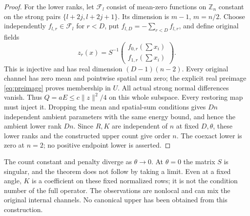 \documentclass[11pt,a4paper]{article}
\newcommand{\Z}{\mathbb Z}
\newcommand{\norm}[1]{\lVert#1\rVert}
\begin{document}
\begin{proof}
For the lower ranks, let $\mathcal F_l$ consist of mean-zero functions on
$\Z_n$ constant on the strong pairs $\{l+2j,l+2j+1\}$.
Its dimension is $m-1$, $m=n/2$. Choose independently
$f_{l,r}\in\mathcal F_l$ for $r<D$, put
$f_{l,D}=-\sum_{r<D}f_{l,r}$, and define original fields
\[
 z_r(x)=S^{-1}\begin{pmatrix}f_{0,r}(\sum x_i)\\ f_{1,r}(\sum x_i)\end{pmatrix}.
\]
This is injective and has real dimension $(D-1)(n-2)$. Every original channel
has zero mean and pointwise spatial sum zero; the explicit real preimage
\eqref{eq:preimage} proves membership in $U$. All actual strong normal
differences vanish. Thus $Q=aE\leq c\norm z^2/4$ on this whole subspace.
Every restoring map must inject it. Dropping the mean and spatial-sum
conditions gives $Dn$ independent ambient parameters with the same energy
bound, and hence the ambient lower rank $Dn$.
Since $R,K$ are independent of $n$ at fixed $D,\theta$, these lower ranks and
the constructed upper count give order $n$. The coexact lower is zero at
$n=2$; no positive endpoint lower is asserted.
\end{proof}

The count constant and penalty diverge as $\theta\to0$. At $\theta=0$ the
matrix $S$ is singular, and the theorem does not follow by taking a limit.
Even at a fixed angle, $K$ is a coefficient on these fixed normalized rows;
it is not the condition number of the full operator. The observations are
nonlocal and can mix the original internal channels. No canonical upper has
been obtained from this construction.
\end{document}
